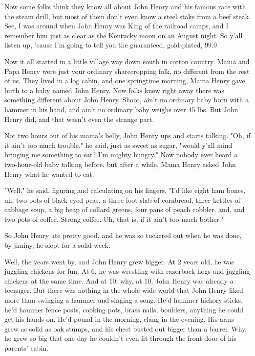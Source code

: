 Now some folks think they know all about John Henry and his famous race with the steam drill, but most of them don't even know a steel stake from a beef steak. See, I was around when John Henry was King of the railroad camps, and I remember him just as clear as the Kentucky moon on an August night. So y'all listen up, 'cause I'm going to tell you the guaranteed, gold-plated, 99.9%

Now it all started in a little village way down south in cotton country. Mama and Papa Henry were just your ordinary sharecropping folk, no different from the rest of us. They lived in a log cabin, and one springtime morning, Mama Henry gave birth to a baby named John Henry. Now folks knew right away there was something different about John Henry. Shoot, ain't no ordinary baby born with a hammer in his hand, and ain't no ordinary baby weighs over 45 lbs. But John Henry did, and that wasn't even the strange part.

Not two hours out of his mama's belly, John Henry ups and starts talking. "Oh, if it ain't too much trouble," he said, just as sweet as sugar, "would y'all mind bringing me something to eat? I'm mighty hungry." Now nobody ever heard a two-hour-old baby talking before, but after a while, Mama Henry asked John Henry what he wanted to eat.

"Well," he said, figuring and calculating on his fingers, "I'd like eight ham bones, uh, two pots of black-eyed peas, a three-foot slab of cornbread, three kettles of cabbage soup, a big heap of collard greens, four pans of peach cobbler, and, and two pots of coffee. Strong coffee. Uh, that is, if it ain't too much bother."

So John Henry ate pretty good, and he was so tuckered out when he was done, by jiminy, he slept for a solid week.

Well, the years went by, and John Henry grew bigger. At 2 years old, he was juggling chickens for fun. At 6, he was wrestling with razorback hogs and juggling chickens at the same time. And at 10, why, at 10, John Henry was already a teenager. But there was nothing in the whole wide world that John Henry liked more than swinging a hammer and singing a song. He'd hammer hickory sticks, he'd hammer fence posts, cooking pots, brass nails, boulders, anything he could get his hands on. He'd pound in the morning, clang in the evening. His arms grew as solid as oak stumps, and his chest busted out bigger than a barrel. Why, he grew so big that one day he couldn't even fit through the front door of his parents' cabin.

